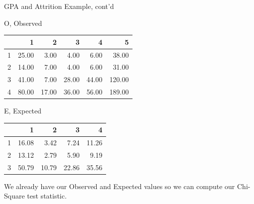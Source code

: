 \documentclass[14pt]{beamer}\usepackage[]{graphicx}\usepackage[]{color}
\begin{document}
\begin{frame}[fragile]{GPA and Attrition Example, cont'd}

\begin{minipage}[ht]{6cm}

{\tiny{

O, Observed 

\begin{table}[ht]
\centering
\begin{tabular}{rrrrrr}
  \hline
 & 1 & 2 & 3 & 4 & 5 \\ 
  \hline
1 & 25.00 & 3.00 & 4.00 & 6.00 & 38.00 \\ 
  2 & 14.00 & 7.00 & 4.00 & 6.00 & 31.00 \\ 
  3 & 41.00 & 7.00 & 28.00 & 44.00 & 120.00 \\ 
  4 & 80.00 & 17.00 & 36.00 & 56.00 & 189.00 \\ 
   \hline
\end{tabular}
\end{table}

}}
\end{minipage} \hfill
\begin{minipage}[ht]{5cm}

{\tiny{

E, Expected

\begin{table}[ht]
\centering
\begin{tabular}{rrrrr}
  \hline
 & 1 & 2 & 3 & 4 \\ 
  \hline
1 & 16.08 & 3.42 & 7.24 & 11.26 \\ 
  2 & 13.12 & 2.79 & 5.90 & 9.19 \\ 
  3 & 50.79 & 10.79 & 22.86 & 35.56 \\ 
   \hline
\end{tabular}
\end{table}

}}
\end{minipage}

\vspace{3mm}

We already have our Observed and Expected values so we can compute our Chi-Square test statistic.

\end{frame}
\end{document}
